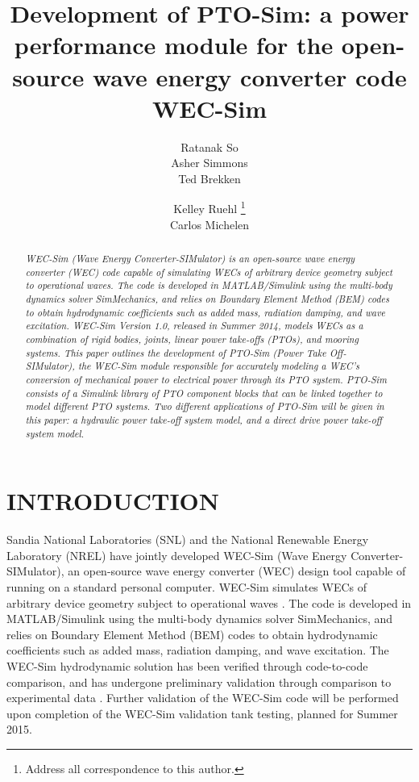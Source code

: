 \documentclass[twocolumn,10pt]{asme2e}
\title{Development of PTO-Sim: a power performance module for the open-source wave energy converter code WEC-Sim}
\author{Ratanak So\\
       {\tensfb Asher Simmons}   \\
       {\tensfb Ted Brekken}   
    \affiliation{
	School of Electrical Engineering and Computer Science\\
	Oregon State University\\
	Corvallis, Oregon USA\\
    }	
}
\author{Kelley Ruehl \thanks{Address all correspondence to this author.} \\
       {\tensfb Carlos Michelen}     
    \affiliation{Water Power Department \\
    	Sandia National Laboratories\\
	Albuquerque, NM USA\\
	Email: kelley.ruehl@sandia.gov
    }
}
\begin{document}
\maketitle    


\begin{abstract}
{\it 
WEC-Sim (Wave Energy Converter-SIMulator) is an open-source wave energy converter (WEC) code capable of simulating WECs of arbitrary device geometry subject to operational waves. The code is developed in MATLAB/Simulink using the multi-body dynamics solver SimMechanics, and relies on Boundary Element Method (BEM) codes to obtain hydrodynamic coefficients such as added mass, radiation damping, and wave excitation. WEC-Sim Version 1.0, released in Summer 2014, models WECs as a combination of rigid bodies, joints, linear power take-offs (PTOs), and mooring systems. This paper outlines the development of PTO-Sim (Power Take Off-SIMulator), the WEC-Sim module responsible for accurately modeling a WEC's conversion of mechanical power to electrical power through its PTO system. PTO-Sim consists of a Simulink library of PTO component blocks that can be linked together to model different PTO systems. Two different applications of PTO-Sim will be given in this paper: a hydraulic power take-off system model, and a direct drive power take-off system model.
}
\end{abstract}


\section*{INTRODUCTION}

Sandia National Laboratories (SNL) and the National Renewable Energy Laboratory (NREL) have jointly developed WEC-Sim (Wave Energy Converter-SIMulator), an open-source wave energy converter (WEC) design tool capable of running on a standard personal computer. WEC-Sim  simulates WECs of arbitrary device geometry subject to operational waves \cite{wecsim}. The code is developed in MATLAB/Simulink using the multi-body dynamics solver SimMechanics, and relies on Boundary Element Method (BEM) codes to obtain hydrodynamic coefficients such as added mass, radiation damping, and wave excitation. The WEC-Sim hydrodynamic solution has been verified through code-to-code comparison, and has undergone preliminary validation through comparison to experimental data \cite{yu2014design}\cite{lawson2014implementing} \cite{ruehl2014preliminary}\cite{yu2014development}.  Further validation of the WEC-Sim code will be performed upon completion of the WEC-Sim validation tank testing, planned for Summer 2015. 
\end{document}
